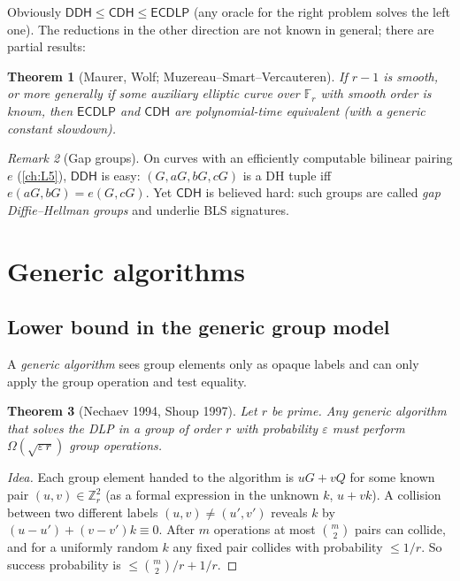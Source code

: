 \documentclass[11pt,a4paper,oneside]{book}
\theoremstyle{plain}
\newtheorem{theorem}{Theorem}[chapter]
\theoremstyle{definition}
\theoremstyle{remark}
\newtheorem{remark}[theorem]{Remark}
\newcommand{\Z}{\mathbb{Z}}
\newcommand{\F}{\mathbb{F}}
\newcommand{\ECDLP}{\mathsf{ECDLP}}
\newcommand{\CDH}{\mathsf{CDH}}
\newcommand{\DDH}{\mathsf{DDH}}
\begin{document}
Obviously $\DDH\le\CDH\le\ECDLP$ (any oracle for the right problem solves the left one). The reductions in the other direction are not known in general; there are partial results:
\begin{theorem}[Maurer, Wolf; Muzereau--Smart--Vercauteren]
If $r-1$ is smooth, or more generally if some auxiliary elliptic curve over $\F_r$ with smooth order is known, then $\ECDLP$ and $\CDH$ are polynomial-time equivalent (with a generic constant slowdown).
\end{theorem}

\begin{remark}[Gap groups]
On curves with an efficiently computable bilinear pairing $e$ (\cref{ch:L5}), $\DDH$ is easy: $(G,aG,bG,cG)$ is a DH tuple iff $e(aG,bG)=e(G,cG)$. Yet $\CDH$ is believed hard: such groups are called \emph{gap Diffie--Hellman groups} and underlie BLS signatures.
\end{remark}

\section{Generic algorithms}

\subsection{Lower bound in the generic group model}

A \emph{generic algorithm} sees group elements only as opaque labels and can only apply the group operation and test equality.

\begin{theorem}[Nechaev 1994, Shoup 1997]\label{thm:shoup}
Let $r$ be prime. Any generic algorithm that solves the DLP in a group of order $r$ with probability $\varepsilon$ must perform $\Omega(\sqrt{\varepsilon\,r})$ group operations.
\end{theorem}
\begin{proof}[Idea]
Each group element handed to the algorithm is $uG+vQ$ for some known pair $(u,v)\in\Z_r^2$ (as a formal expression in the unknown $k$, $u+vk$). A collision between two different labels $(u,v)\ne(u',v')$ reveals $k$ by $(u-u')+(v-v')k\equiv0$. After $m$ operations at most $\binom m2$ pairs can collide, and for a uniformly random $k$ any fixed pair collides with probability $\le1/r$. So success probability is $\le\binom m2/r+1/r$.
\end{proof}
\end{document}
